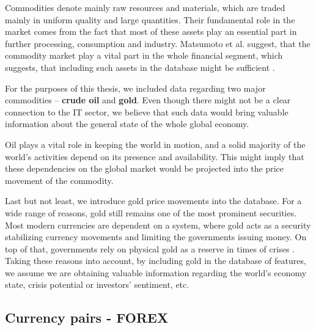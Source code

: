 Commodities denote mainly raw resources and materials, which are traded mainly in uniform quality and large quantities. Their fundamental role in the market
comes from the fact that most of these assets play an essential part in further processing, consumption and industry. Matsumoto et al. suggest, that the commodity
market play a vital part in the whole financial segment, which suggests, that including such assets in the database might be sufficient \cite{clanok3}.
\par
For the purposes of this thesis, we included data regarding two major commodities – \textbf{crude oil} and \textbf{gold}. Even though there might not be a clear
connection to the IT sector, we believe that such data would bring valuable information about the general state 
of the whole global economy.
\par
Oil plays a vital role in keeping the world in motion, and a solid majority of the world's activities depend on its presence and availability.
This might imply that these dependencies on the global market would be projected into the price movement of the commodity.
\par
Last but not least, we introduce gold price movements into the database. For a wide range of reasons, gold still remains one of the most
prominent securities. Most modern currencies are dependent on a system, where gold acts as a security stabilizing currency movements and limiting
the governments issuing money. On top of that, governments rely on physical gold as a reserve in times of crises \cite{gold}. Taking these reasons into account, 
by including gold in the database of features, we assume we are obtaining valuable information regarding the world's economy state, crisis potential or investors' sentiment, etc.

\subsection{Currency pairs - FOREX}

